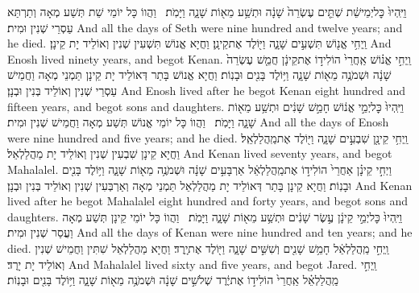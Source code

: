 {וַיִּֽהְיוּ֙ כׇּל\maqqaf יְמֵי\maqqaf שֵׁ֔ת שְׁתֵּ֤ים עֶשְׂרֵה֙ שָׁנָ֔ה וּתְשַׁ֥ע מֵא֖וֹת שָׁנָ֑ה וַיָּמֹֽת׃ \setuma }
{וַהֲווֹ כָּל יוֹמֵי שֵׁת תְּשַׁע מְאָה וְתַרְתַּא עַסְרֵי שְׁנִין וּמִית׃}
{And all the days of Seth were nine hundred and twelve years; and he died.}{}
{וַֽיְחִ֥י אֱנ֖וֹשׁ תִּשְׁעִ֣ים שָׁנָ֑ה וַיּ֖וֹלֶד אֶת\maqqaf קֵינָֽן׃}
{וַחֲיָא אֱנוֹשׁ תִּשְׁעִין שְׁנִין וְאוֹלֵיד יָת קֵינָן׃}
{And Enosh lived ninety years, and begot Kenan.}{}
{וַֽיְחִ֣י אֱנ֗וֹשׁ אַֽחֲרֵי֙ הוֹלִיד֣וֹ אֶת\maqqaf קֵינָ֔ן חֲמֵ֤שׁ עֶשְׂרֵה֙ שָׁנָ֔ה וּשְׁמֹנֶ֥ה מֵא֖וֹת שָׁנָ֑ה וַיּ֥וֹלֶד בָּנִ֖ים וּבָנֽוֹת׃}
{וַחֲיָא אֱנוֹשׁ בָּתַר דְּאוֹלֵיד יָת קֵינָן תַּמְנֵי מְאָה וַחֲמֵישׁ עַסְרֵי שְׁנִין וְאוֹלֵיד בְּנִין וּבְנָן׃}
{And Enosh lived after he begot Kenan eight hundred and fifteen years, and begot sons and daughters.}{}
{וַיִּֽהְיוּ֙ כׇּל\maqqaf יְמֵ֣י אֱנ֔וֹשׁ חָמֵ֣שׁ שָׁנִ֔ים וּתְשַׁ֥ע מֵא֖וֹת שָׁנָ֑ה וַיָּמֹֽת׃ \setuma }
{וַהֲווֹ כָּל יוֹמֵי אֱנוֹשׁ תְּשַׁע מְאָה וַחֲמֵישׁ שְׁנִין וּמִית׃}
{And all the days of Enosh were nine hundred and five years; and he died.}{}
{וַֽיְחִ֥י קֵינָ֖ן שִׁבְעִ֣ים שָׁנָ֑ה וַיּ֖וֹלֶד אֶת\maqqaf מַֽהֲלַלְאֵֽל׃}
{וַחֲיָא קֵינָן שִׁבְעִין שְׁנִין וְאוֹלֵיד יָת מַהֲלַלְאֵל׃}
{And Kenan lived seventy years, and begot Mahalalel.}{}
{וַיְחִ֣י קֵינָ֗ן אַחֲרֵי֙ הוֹלִיד֣וֹ אֶת\maqqaf מַֽהֲלַלְאֵ֔ל אַרְבָּעִ֣ים שָׁנָ֔ה וּשְׁמֹנֶ֥ה מֵא֖וֹת שָׁנָ֑ה וַיּ֥וֹלֶד בָּנִ֖ים וּבָנֽוֹת׃}
{וַחֲיָא קֵינָן בָּתַר דְּאוֹלֵיד יָת מַהֲלַלְאֵל תַּמְנֵי מְאָה וְאַרְבְּעִין שְׁנִין וְאוֹלֵיד בְּנִין וּבְנָן׃}
{And Kenan lived after he begot Mahalalel eight hundred and forty years, and begot sons and daughters.}{}
{וַיִּֽהְיוּ֙ כׇּל\maqqaf יְמֵ֣י קֵינָ֔ן עֶ֣שֶׂר שָׁנִ֔ים וּתְשַׁ֥ע מֵא֖וֹת שָׁנָ֑ה וַיָּמֹֽת׃ \setuma }
{וַהֲווֹ כָּל יוֹמֵי קֵינָן תְּשַׁע מְאָה וַעֲסַר שְׁנִין וּמִית׃}
{And all the days of Kenan were nine hundred and ten years; and he died.}{}
{וַֽיְחִ֣י מַֽהֲלַלְאֵ֔ל חָמֵ֥שׁ שָׁנִ֖ים וְשִׁשִּׁ֣ים שָׁנָ֑ה וַיּ֖וֹלֶד אֶת\maqqaf יָֽרֶד׃}
{וַחֲיָא מַהֲלַלְאֵל שִׁתִּין וַחֲמֵישׁ שְׁנִין וְאוֹלֵיד יָת יָרֶד׃}
{And Mahalalel lived sixty and five years, and begot Jared.}{}
{וַֽיְחִ֣י מַֽהֲלַלְאֵ֗ל אַֽחֲרֵי֙ הוֹלִיד֣וֹ אֶת\maqqaf יֶ֔רֶד שְׁלֹשִׁ֣ים שָׁנָ֔ה וּשְׁמֹנֶ֥ה מֵא֖וֹת שָׁנָ֑ה וַיּ֥וֹלֶד בָּנִ֖ים וּבָנֽוֹת׃}
